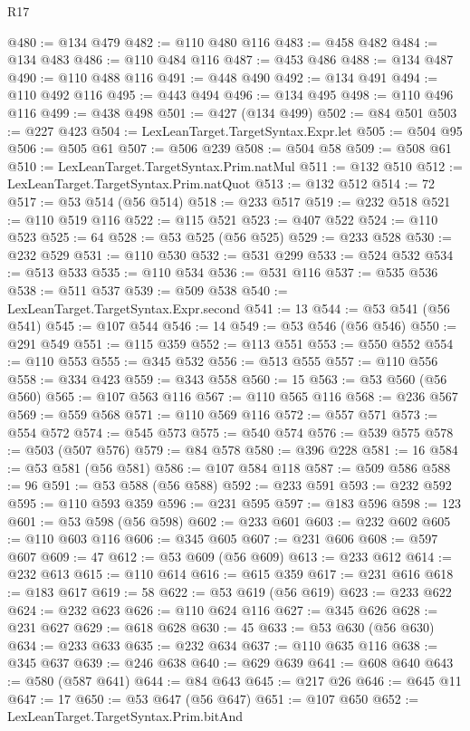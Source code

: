 \begin{lexlean}{R17}
\begin{coremodule}
@480 := @134 @479
@482 := @110 @480 @116
@483 := @458 @482
@484 := @134 @483
@486 := @110 @484 @116
@487 := @453 @486
@488 := @134 @487
@490 := @110 @488 @116
@491 := @448 @490
@492 := @134 @491
@494 := @110 @492 @116
@495 := @443 @494
@496 := @134 @495
@498 := @110 @496 @116
@499 := @438 @498
@501 := @427 (@134 @499)
@502 := @84 @501
@503 := @227 @423
@504 := LexLeanTarget.TargetSyntax.Expr.let
@505 := @504 @95
@506 := @505 @61
@507 := @506 @239
@508 := @504 @58
@509 := @508 @61
@510 := LexLeanTarget.TargetSyntax.Prim.natMul
@511 := @132 @510
@512 := LexLeanTarget.TargetSyntax.Prim.natQuot
@513 := @132 @512
@514 := 72
@517 := @53 @514 (@56 @514)
@518 := @233 @517
@519 := @232 @518
@521 := @110 @519 @116
@522 := @115 @521
@523 := @407 @522
@524 := @110 @523
@525 := 64
@528 := @53 @525 (@56 @525)
@529 := @233 @528
@530 := @232 @529
@531 := @110 @530
@532 := @531 @299
@533 := @524 @532
@534 := @513 @533
@535 := @110 @534
@536 := @531 @116
@537 := @535 @536
@538 := @511 @537
@539 := @509 @538
@540 := LexLeanTarget.TargetSyntax.Expr.second
@541 := 13
@544 := @53 @541 (@56 @541)
@545 := @107 @544
@546 := 14
@549 := @53 @546 (@56 @546)
@550 := @291 @549
@551 := @115 @359
@552 := @113 @551
@553 := @550 @552
@554 := @110 @553
@555 := @345 @532
@556 := @513 @555
@557 := @110 @556
@558 := @334 @423
@559 := @343 @558
@560 := 15
@563 := @53 @560 (@56 @560)
@565 := @107 @563 @116
@567 := @110 @565 @116
@568 := @236 @567
@569 := @559 @568
@571 := @110 @569 @116
@572 := @557 @571
@573 := @554 @572
@574 := @545 @573
@575 := @540 @574
@576 := @539 @575
@578 := @503 (@507 @576)
@579 := @84 @578
@580 := @396 @228
@581 := 16
@584 := @53 @581 (@56 @581)
@586 := @107 @584 @118
@587 := @509 @586
@588 := 96
@591 := @53 @588 (@56 @588)
@592 := @233 @591
@593 := @232 @592
@595 := @110 @593 @359
@596 := @231 @595
@597 := @183 @596
@598 := 123
@601 := @53 @598 (@56 @598)
@602 := @233 @601
@603 := @232 @602
@605 := @110 @603 @116
@606 := @345 @605
@607 := @231 @606
@608 := @597 @607
@609 := 47
@612 := @53 @609 (@56 @609)
@613 := @233 @612
@614 := @232 @613
@615 := @110 @614
@616 := @615 @359
@617 := @231 @616
@618 := @183 @617
@619 := 58
@622 := @53 @619 (@56 @619)
@623 := @233 @622
@624 := @232 @623
@626 := @110 @624 @116
@627 := @345 @626
@628 := @231 @627
@629 := @618 @628
@630 := 45
@633 := @53 @630 (@56 @630)
@634 := @233 @633
@635 := @232 @634
@637 := @110 @635 @116
@638 := @345 @637
@639 := @246 @638
@640 := @629 @639
@641 := @608 @640
@643 := @580 (@587 @641)
@644 := @84 @643
@645 := @217 @26
@646 := @645 @11
@647 := 17
@650 := @53 @647 (@56 @647)
@651 := @107 @650
@652 := LexLeanTarget.TargetSyntax.Prim.bitAnd

\end{coremodule}
\end{lexlean}
